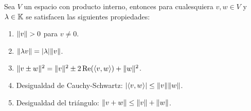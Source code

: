 \begin{teor} \label{teor:propNorm}
  Sea $V$ un espacio con producto interno, entonces para cualesquiera $v,w \in V$ y $\lambda \in \mathbb{K}$ se satisfacen las siguientes propiedades:
  \begin{enumerate}
    \item $\norm{v}>0$ para $v \neq 0$.
    \item $\mathopen\|\lambda v\mathclose\| = \mathopen|\lambda\mathclose|\mathopen\|v\mathclose\|$.
    \item $\mathopen\|v \pm w\mathclose\|^2 = \mathopen\|v\mathclose\|^2 \pm 2 \operatorname{Re}(\langle v,w\rangle) + \mathopen\|w\mathclose\|^2$.
    \item Desigualdad de Cauchy-Schwartz: $\mathopen|\langle v,w\rangle\mathclose| \leq \mathopen\|v\mathclose\| \mathopen\|w\mathclose\|$.
    \item Desigualdad del triángulo: $\mathopen\|v+w\mathclose\| \leq \mathopen\|v\mathclose\| + \mathopen\|w\mathclose\|$.
  \end{enumerate}
\end{teor}
